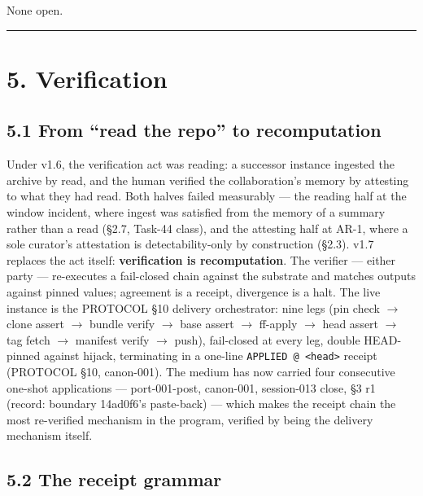 \documentclass[11pt]{article}
\begin{document}
None open.

\begin{center}\rule{0.5\linewidth}{0.5pt}\end{center}

\section{5. Verification}\label{verification}

\subsection{5.1 From ``read the repo'' to recomputation}\label{from-read-the-repo-to-recomputation}

Under v1.6, the verification act was reading: a successor instance ingested the archive by read, and the human verified the collaboration's memory by attesting to what they had read. Both halves failed measurably --- the reading half at the window incident, where ingest was satisfied from the memory of a summary rather than a read (\S{}2.7, Task-44 class), and the attesting half at AR-1, where a sole curator's attestation is detectability-only by construction (\S{}2.3). v1.7 replaces the act itself: \textbf{verification is recomputation}. The verifier --- either party --- re-executes a fail-closed chain against the substrate and matches outputs against pinned values; agreement is a receipt, divergence is a halt. The live instance is the PROTOCOL \S{}10 delivery orchestrator: nine legs (pin check \(\to\) clone assert \(\to\) bundle verify \(\to\) base assert \(\to\) ff-apply \(\to\) head assert \(\to\) tag fetch \(\to\) manifest verify \(\to\) push), fail-closed at every leg, double HEAD-pinned against hijack, terminating in a one-line \texttt{APPLIED\ @\ \textless{}head\textgreater{}} receipt (PROTOCOL \S{}10, canon-001). The medium has now carried four consecutive one-shot applications --- port-001-post, canon-001, session-013 close, \S{}3 r1 (record: boundary 14ad0f6's paste-back) --- which makes the receipt chain the most re-verified mechanism in the program, verified by being the delivery mechanism itself.

\subsection{5.2 The receipt grammar}\label{the-receipt-grammar}
\end{document}
